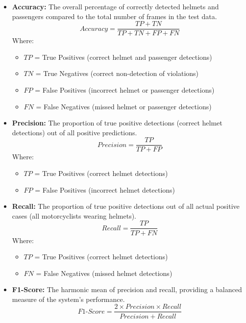\begin{refsection}
\begin{itemize}
    \item \textbf{Accuracy:} The overall percentage of correctly detected helmets and passengers compared to the total number of frames in the test data.
    \begin{equation}
        Accuracy = \frac{TP + TN}{TP + TN + FP + FN}
        \label{eq:accuracy}
    \end{equation}
    Where:
    \begin{itemize}
        \item $TP$ = True Positives (correct helmet and passenger detections)
        \item $TN$ = True Negatives (correct non-detection of violations)
        \item $FP$ = False Positives (incorrect helmet or passenger detections)
        \item $FN$ = False Negatives (missed helmet or passenger detections)
    \end{itemize}


    \item \textbf{Precision:} The proportion of true positive detections (correct helmet detections) out of all positive predictions.
    \begin{equation}
        Precision = \frac{TP}{TP + FP}
        \label{eq:precision}
    \end{equation}
    Where:
    \begin{itemize}
        \item $TP$ = True Positives (correct helmet detections)
        \item $FP$ = False Positives (incorrect helmet detections)
    \end{itemize}


    \item \textbf{Recall:} The proportion of true positive detections out of all actual positive cases (all motorcyclists wearing helmets).
    \begin{equation}
        Recall = \frac{TP}{TP + FN}
        \label{eq:recall}
    \end{equation}
    Where:
    \begin{itemize}
        \item $TP$ = True Positives (correct helmet detections)
        \item $FN$ = False Negatives (missed helmet detections)
    \end{itemize}


    \item \textbf{F1-Score:} The harmonic mean of precision and recall, providing a balanced measure of the system’s performance.
    \begin{equation}
        F1\text{-}Score = \frac{2 \times Precision \times Recall}{Precision + Recall}
        \label{eq:f1score}
    \end{equation}
\end{itemize}



\end{refsection}
